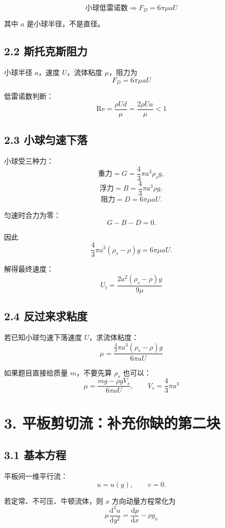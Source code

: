 \documentclass[12pt,a4paper]{ctexart}
\newcommand{\dd}{\mathrm d}
\newcommand{\Rey}{\mathrm{Re}}
\begin{document}
\[
\boxed{
\text{小球低雷诺数} \Rightarrow F_D=6\pi\mu aU
}
\]

其中 \(a\) 是小球半径，不是直径。

\subsection*{2.2 斯托克斯阻力}

小球半径 \(a\)，速度 \(U\)，流体粘度 \(\mu\)，阻力为
\[
\boxed{
F_D=6\pi\mu aU
}
\]

低雷诺数判断：
\[
\boxed{
\Rey=\frac{\rho Ud}{\mu}
=\frac{2\rho Ua}{\mu}<1
}
\]

\subsection*{2.3 小球匀速下落}

小球受三种力：
\[
\text{重力}=G=\frac43\pi a^3\rho_s g,
\]
\[
\text{浮力}=B=\frac43\pi a^3\rho g,
\]
\[
\text{阻力}=D=6\pi\mu aU.
\]

匀速时合力为零：
\[
G-B-D=0.
\]

因此
\[
\frac43\pi a^3(\rho_s-\rho)g=6\pi\mu aU.
\]

解得最终速度：
\[
\boxed{
U_t=\frac{2a^2(\rho_s-\rho)g}{9\mu}
}
\]

\subsection*{2.4 反过来求粘度}

若已知小球匀速下落速度 \(U\)，求流体粘度：
\[
\boxed{
\mu=
\frac{\frac43\pi a^3(\rho_s-\rho)g}{6\pi aU}
}
\]

如果题目直接给质量 \(m\)，不要先算 \(\rho_s\) 也可以：
\[
\boxed{
\mu=
\frac{mg-\rho gV_s}{6\pi aU},
\qquad
V_s=\frac43\pi a^3
}
\]

\section*{3. 平板剪切流：补充你缺的第二块}

\subsection*{3.1 基本方程}

平板间一维平行流：
\[
u=u(y),\qquad v=0.
\]

若定常、不可压、牛顿流体，则 \(x\) 方向动量方程常化为
\[
\boxed{
\mu\frac{\dd^2u}{\dd y^2}
=\frac{\dd p}{\dd x}-\rho g_x
}
\]
\end{document}
